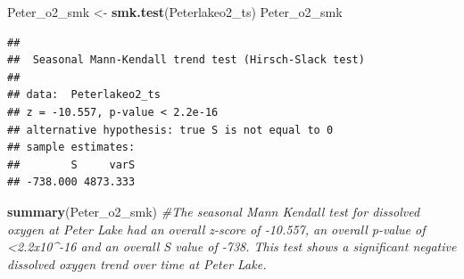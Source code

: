 \documentclass[12pt,]{article}
\newenvironment{Shaded}{\begin{snugshade}}{\end{snugshade}}
\newcommand{\KeywordTok}[1]{\textcolor[rgb]{0.13,0.29,0.53}{\textbf{#1}}}
\newcommand{\StringTok}[1]{\textcolor[rgb]{0.31,0.60,0.02}{#1}}
\newcommand{\CommentTok}[1]{\textcolor[rgb]{0.56,0.35,0.01}{\textit{#1}}}
\newcommand{\NormalTok}[1]{#1}
\begin{document}
\begin{Shaded}
\begin{Highlighting}[]
\NormalTok{Peter_o2_smk <-}\StringTok{ }\KeywordTok{smk.test}\NormalTok{(Peterlakeo2_ts)}
\NormalTok{Peter_o2_smk}
\end{Highlighting}
\end{Shaded}

\begin{verbatim}
## 
##  Seasonal Mann-Kendall trend test (Hirsch-Slack test)
## 
## data:  Peterlakeo2_ts
## z = -10.557, p-value < 2.2e-16
## alternative hypothesis: true S is not equal to 0
## sample estimates:
##        S     varS 
## -738.000 4873.333
\end{verbatim}

\begin{Shaded}
\begin{Highlighting}[]
\KeywordTok{summary}\NormalTok{(Peter_o2_smk) }\CommentTok{#The seasonal Mann Kendall test for dissolved oxygen at Peter Lake had an overall z-score of -10.557, an overall p-value of <2.2x10^-16 and an overall S value of -738. This test shows a significant negative dissolved oxygen trend over time at Peter Lake.}
\end{Highlighting}
\end{Shaded}
\end{document}
